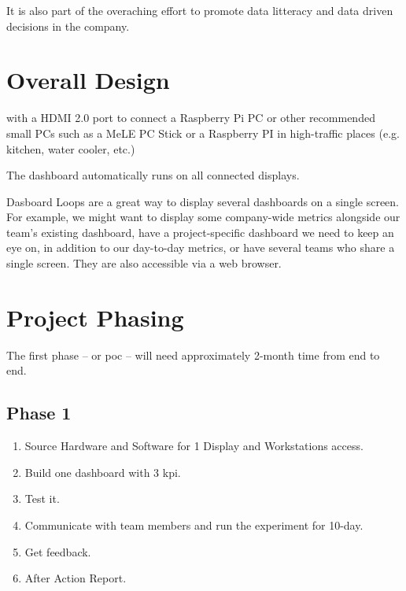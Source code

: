\documentclass{tufte-handout}
\begin{document}
  \par It is also part of the overaching effort to promote data litteracy\cite{geckoboard-data-fallacies} and data driven decisions in the company.

\section{Overall Design}\label{sec:overall-design}
 with  a HDMI 2.0 port to connect a Raspberry Pi PC or other recommended small PCs such as a  MeLE PC Stick\cite{Amazoncom_B08LYRQZ59} or a Raspberry PI\cite{Raspberry-5} in high-traffic places (e.g. kitchen, water cooler, etc.) 
\par The dashboard automatically runs on all connected displays. 
\par Dasboard Loops are a great way to display several dashboards on a single screen. For example, we might want to display some company-wide metrics alongside our team’s existing dashboard, have a project-specific dashboard we need to keep an eye on, in addition to our day-to-day metrics, or have several teams who share a single screen. They are also accessible via a web browser.

\section{Project Phasing}\label{sec:phasing}
 The first phase – or \gls{poc} – will need approximately 2-month time from end to end.

\subsection{Phase 1}
  \begin{enumerate}
    \item Source Hardware and Software for 1 Display and Workstations access.
    \item Build one dashboard with 3 \gls{kpi}.
    \item Test it.
    \item Communicate with team members and run the experiment for 10-day.
    \item Get feedback.
    \item After Action Report.
  \end{enumerate}
\end{document}
